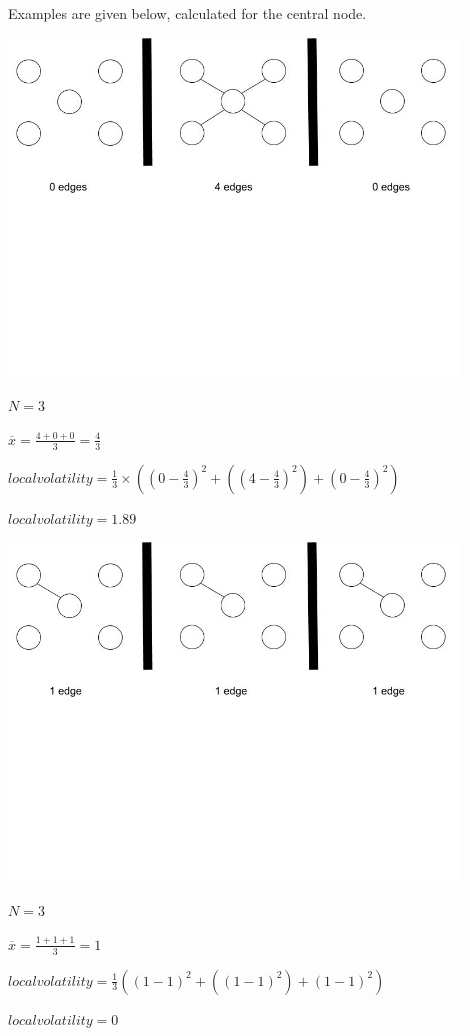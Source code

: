 Examples are given below, calculated for the central node.


\begin{center}
\includegraphics[trim={0 10cm 0 -1cm}, width=120mm]{./Figures/volatility1.jpg}

$N = 3$

$\overline{x} = \frac{4 + 0 + 0}{3} = \frac{4}{3}$

$local volatility =\frac{1}{3}\times((0 - \frac{4}{3})^2 + ((4 - \frac{4}{3})^2) + (0 - \frac{4}{3})^2) $

$local volatility = 1.89$

\includegraphics[trim={0 10cm 0 -1cm}, width=120mm]{./Figures/volatility2.jpg}

$N = 3$

$\overline{x} = \frac{1 + 1 + 1}{3} = 1$

$local volatility =\frac{1}{3}((1 - 1)^2 + ((1 - 1)^2) + (1 - 1)^2) $

$local volatility = 0$
\end{center}

